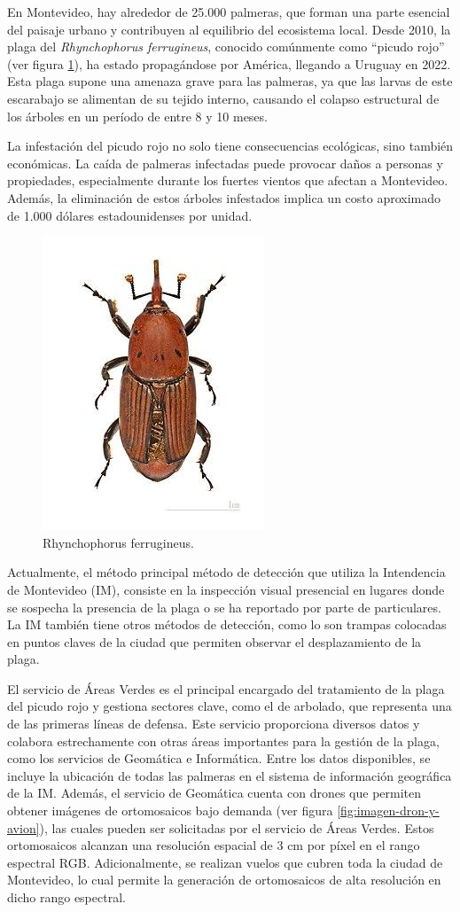 \documentclass[
11pt, %
]{charter}
\begin{document}
En Montevideo, hay alrededor de 25.000 palmeras, que forman una parte esencial del paisaje urbano y contribuyen al equilibrio del ecosistema local. Desde 2010, la plaga del \textit{Rhynchophorus ferrugineus}, conocido comúnmente como “picudo rojo” (ver figura \ref{fig:picudo-rojo}), ha estado propagándose por América, llegando a Uruguay en 2022. Esta plaga supone una amenaza grave para las palmeras, ya que las larvas de este escarabajo se alimentan de su tejido interno, causando el colapso estructural de los árboles en un período de entre 8 y 10 meses.

La infestación del picudo rojo no solo tiene consecuencias ecológicas, sino también económicas. La caída de palmeras infectadas puede provocar daños a personas y propiedades, especialmente durante los fuertes vientos que afectan a Montevideo. Además, la eliminación de estos árboles infestados implica un costo aproximado de 1.000 dólares estadounidenses por unidad.

\begin{figure}[H]
  \centering
  \includegraphics[width=.30\textwidth]{./Figuras/picudo-rojo.png}
  \caption{Rhynchophorus ferrugineus.}
  \label{fig:picudo-rojo}
\end{figure}

Actualmente, el método principal método de detección que utiliza la Intendencia de Montevideo (IM), consiste en la inspección visual presencial en lugares donde se sospecha la presencia de la plaga o se ha reportado por parte de particulares. La IM también tiene otros métodos de detección, como lo son trampas colocadas en puntos claves de la ciudad que permiten observar el desplazamiento de la plaga.

El servicio de Áreas Verdes es el principal encargado del tratamiento de la plaga del picudo rojo y gestiona sectores clave, como el de arbolado, que representa una de las primeras líneas de defensa. Este servicio proporciona diversos datos y colabora estrechamente con otras áreas importantes para la gestión de la plaga, como los servicios de Geomática e Informática. Entre los datos disponibles, se incluye la ubicación de todas las palmeras en el sistema de información geográfica de la IM. Además, el servicio de Geomática cuenta con drones que permiten obtener imágenes de ortomosaicos bajo demanda (ver figura \ref{fig:imagen-dron-y-avion}), las cuales pueden ser solicitadas por el servicio de Áreas Verdes. Estos ortomosaicos alcanzan una resolución espacial de 3 cm por píxel en el rango espectral RGB. Adicionalmente, se realizan vuelos que cubren toda la ciudad de Montevideo, lo cual permite la generación de ortomosaicos de alta resolución en dicho rango espectral.
\end{document}

